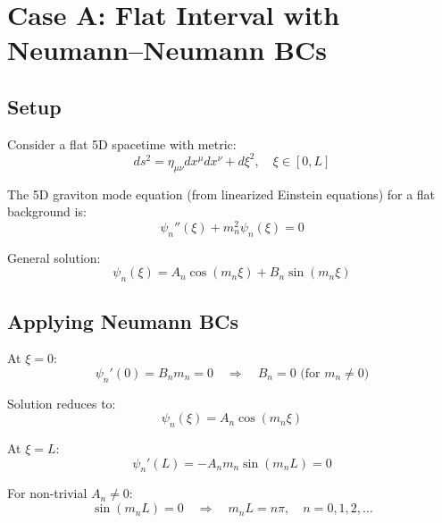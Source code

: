 \documentclass[11pt,a4paper]{article}
\begin{document}
\section{Case A: Flat Interval with Neumann--Neumann BCs}

\subsection{Setup}

Consider a flat 5D spacetime with metric:
\begin{equation}
ds^2 = \eta_{\mu\nu} dx^\mu dx^\nu + d\xi^2, \quad \xi \in [0, L]
\label{eq:caseA-metric}
\end{equation}

The 5D graviton mode equation (from linearized Einstein equations) for a flat
background is:
\begin{equation}
\psi_n''(\xi) + m_n^2 \psi_n(\xi) = 0
\label{eq:caseA-mode-eq}
\end{equation}

General solution:
\begin{equation}
\psi_n(\xi) = A_n \cos(m_n \xi) + B_n \sin(m_n \xi)
\label{eq:caseA-general}
\end{equation}

\subsection{Applying Neumann BCs}

At $\xi = 0$:
\begin{equation}
\psi_n'(0) = B_n m_n = 0 \quad \Rightarrow \quad B_n = 0 \text{ (for } m_n \neq 0\text{)}
\label{eq:caseA-BC-left}
\end{equation}

Solution reduces to:
\begin{equation}
\psi_n(\xi) = A_n \cos(m_n \xi)
\label{eq:caseA-cos-form}
\end{equation}

At $\xi = L$:
\begin{equation}
\psi_n'(L) = -A_n m_n \sin(m_n L) = 0
\label{eq:caseA-BC-right}
\end{equation}

For non-trivial $A_n \neq 0$:
\begin{equation}
\sin(m_n L) = 0 \quad \Rightarrow \quad m_n L = n\pi, \quad n = 0, 1, 2, \ldots
\label{eq:caseA-quantization}
\end{equation}
\end{document}
